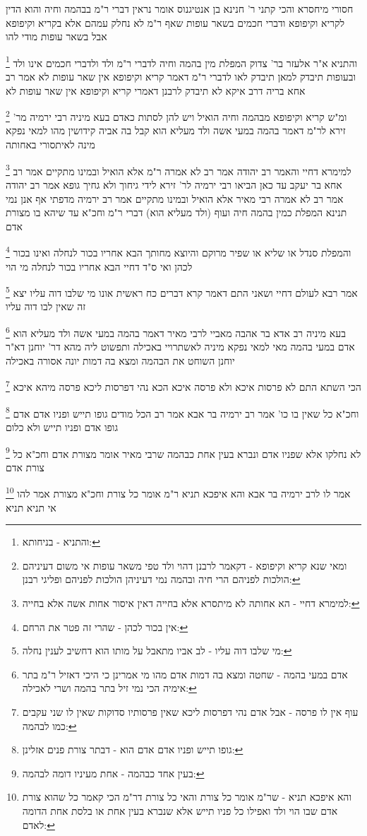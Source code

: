 \documentclass[12pt, openany]{book}
\newcommand{\footnotecomment}[1]{
	\renewcommand\thefootnote{}
	\footnote{#1}}
\newcommand{\commenta}[1]{\footnotecomment{#1}}
\begin{document}
{{חסורי מיחסרא והכי קתני ר' חנינא בן אנטיגנוס אומר נראין דברי ר"מ בבהמה וחיה והוא הדין לקריא וקיפופא ודברי חכמים בשאר עופות שאף ר"מ לא נחלק עמהם אלא בקריא וקיפופא אבל בשאר עופות מודי להו 
\commenta{והתניא - בניחותא:}
והתניא א"ר אלעזר בר' צדוק המפלת מין בהמה וחיה לדברי ר"מ ולד ולדברי חכמים אינו ולד ובעופות תיבדק 
למאן תיבדק לאו לדברי ר"מ דאמר קריא וקיפופא אין שאר עופות לא 
אמר רב אחא בריה דרב איקא לא תיבדק לרבנן דאמרי קריא וקיפופא אין שאר עופות לא 
\commenta{ומאי שנא קריא וקיפופא - דקאמר לרבנן דהוי ולד טפי משאר עופות אי משום דעיניהם הולכות לפניהם הרי חיה ובהמה נמי דעיניהן הולכות לפניהם ופליגי רבנן:}
ומ"ש קריא וקיפופא מבהמה וחיה הואיל ויש להן לסתות כאדם 
בעא מיניה רבי ירמיה מר' זירא לר"מ דאמר בהמה במעי אשה ולד מעליא הוא קבל בה אביה קידושין מהו למאי נפקא מינה לאיתסורי באחותה 
\commenta{למימרא דחיי - הא אחותה לא מיתסרא אלא בחייה דאין איסור אחות אשה אלא בחייה:}
למימרא דחיי והאמר רב יהודה אמר רב לא אמרה ר"מ אלא הואיל ובמינו מתקיים אמר רב אחא בר יעקב עד כאן הביאו רבי ירמיה לר' זירא לידי גיחוך ולא גחיך 
גופא אמר רב יהודה אמר רב לא אמרה רבי מאיר אלא הואיל ובמינו מתקיים אמר רב ירמיה מדפתי
אף אנן נמי תנינא המפלת כמין בהמה חיה ועוף (ולד מעליא הוא) דברי ר"מ וחכ"א עד שיהא בו מצורת אדם 
\commenta{אין בכור לכהן - שהרי זה פטר את הרחם:}
והמפלת סנדל או שליא או שפיר מרוקם והיוצא מחותך הבא אחריו בכור לנחלה ואינו בכור לכהן ואי ס"ד דחיי הבא אחריו בכור לנחלה מי הוי 
\commenta{מי שלבו דוה עליו - לב אביו מתאבל על מותו הוא דחשיב לענין נחלה:}
אמר רבא לעולם דחיי ושאני התם דאמר קרא {דברים כח } ראשית אונו מי שלבו דוה עליו יצא זה שאין לבו דוה עליו 
\commenta{אדם במעי בהמה - שחטה ומצא בה דמות אדם מהו מי אמרינן כי היכי דאזיל ר"מ בתר אימיה הכי נמי זיל בתר בהמה ושרי לאכילה:}
בעא מיניה רב אדא בר אהבה מאביי לרבי מאיר דאמר בהמה במעי אשה ולד מעליא הוא אדם במעי בהמה מאי למאי נפקא מיניה לאשתרויי באכילה 
ותפשוט ליה מהא דר' יוחנן דא"ר יוחנן השוחט את הבהמה ומצא בה דמות יונה אסורה באכילה 
\commenta{עוף אין לו פרסה - אבל אדם נהי דפרסות ליכא שאין פרסותיו סדוקות שאין לו שני עקבים כמו לבהמה:}
הכי השתא התם לא פרסות איכא ולא פרסה איכא הכא נהי דפרסות ליכא פרסה מיהא איכא
\commenta{גופו תייש ופניו אדם אדם הוא - דבתר צורת פנים אזלינן:}
וחכ"א כל שאין בו כו' אמר רב ירמיה בר אבא אמר רב הכל מודים גופו תייש ופניו אדם אדם גופו אדם ופניו תייש ולא כלום
\commenta{בעין אחד כבהמה - אחת מעיניו דומה לבהמה: }
לא נחלקו אלא שפניו אדם ונברא בעין אחת כבהמה שרבי מאיר אומר מצורת אדם וחכ"א כל צורת אדם 
\commenta{והא איפכא תניא - שר"מ אומר כל צורת והאי כל צורת דר"מ הכי קאמר כל שהוא צורת אדם שבו הוי ולד ואפילו כל פניו תייש אלא שנברא בעין אחת או בלסת אחת הדומה לאדם:}
אמר לו לרב ירמיה בר אבא והא איפכא תניא ר"מ אומר כל צורת וחכ"א מצורת אמר להו אי תניא תניא 
}}
\end{document}
